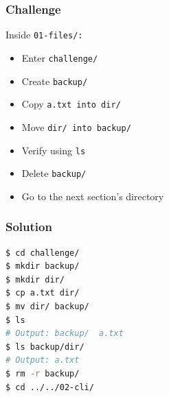 \begin{frame}
\frametitle{Challenge}
Inside \tt{01-files/}:
\begin{itemize}
    \item Enter \tt{challenge/}
    \item Create \tt{backup/}
    \item Copy \tt{a.txt} into \tt{dir/}
    \item Move \tt{dir/} into \tt{backup/}
    \item Verify using \tt{ls}
    \item Delete \tt{backup/}
    \item Go to the next section's directory
\end{itemize}
\end{frame}

\begin{frame}[fragile]
\frametitle{Solution}
\begin{lstlisting}[language=bash]
$ cd challenge/
$ mkdir backup/
$ mkdir dir/
$ cp a.txt dir/
$ mv dir/ backup/
$ ls
# Output: backup/  a.txt
$ ls backup/dir/
# Output: a.txt
$ rm -r backup/
$ cd ../../02-cli/
\end{lstlisting}
\end{frame}